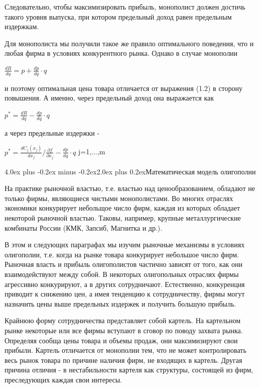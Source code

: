 \documentclass[12pt, 4paper]{book}
\makeatletter
\renewcommand{\section}{\@startsection{section}{1}{1pt}%
	{4.0ex plus -0.2ex minus -0.2ex}{2.0ex plus 0.2ex}{\centering\bf}}%
\makeatother
\begin{document}
{Следовательно, чтобы максимизировать прибыль, монополист должен достичь такого уровня выпуска, при котором предельный доход равен предельным издержкам.
\par

Для монополиста мы получили такое же правило оптимального поведения, что и любая фирма в условиях конкурентного рынка. Однако в случае монополии
\begin{center}
$\frac{d R}{d q}= p+ \frac{d p}{d q}\cdot q$
\end{center}
и поэтому оптимальная цена товара отличается от выражения (1.2) в сторону повышения. А именно, через предельный доход она выражается как
\begin{center}
$p^{*} = \frac{d R}{d q} - \frac{d p}{d q}\cdot q$
\end{center}
а через предельные издержки - 
\begin{center}
$p^{*}=\frac{d C_j(x_j)}{d x_j}/\frac{\partial f}{\partial x_j} - \frac{d p}{d q}\cdot q$ j=1,...,m
\end{center}

\newpage
\begin{center}
\section{Математическая модель олигополии}
\end{center}
\par

На практике рыночной властью, т.е. властью над ценообразованием, обладают не только фирмы, являющиеся чистыми монополистами. Во многих отраслях экономики конкурирует небольщое число фирм, каждая из которых обладает некоторой рыночной властью. Таковы, например, крупные металлургические комбинаты России (КМК, Запсиб, Магнитка и др.).
\par

В этом и следующих параграфах мы изучим рыночные механизмы в условиях олигополии, т.е. когда на рынке товара конкурирует небольшое число фирм. Рыночная власть и прибыль олигополистов частично зависят от того, как они взаимодействуют между собой. В некоторых олигопольных отраслях фирмы агрессивно конкурируют, а в других сотрудничают. Естественно, конкуренция приводит к снижению цен, а имея тенденцию к сотрудничеству, фирмы могут назначить цены выше предельных издержек и получить большую прибыль.
\par

Крайнюю форму сотрудничества представляет собой картель. На картельном рынке некоторые или все фирмы вступают в сговор по поводу захвата рынка. Определяя сообща цены товара и объемы продаж, они максимизируют свои прибыли. Картель отличается от монополии тем, что не может контролировать весь рынок товара по причине наличия фирм, не входящих в картель. Другая причина отличия - в нестабильности картеля как структуры, состоящей из фирм, преследующих каждая свои интересы.
\par

}
\end{document}

